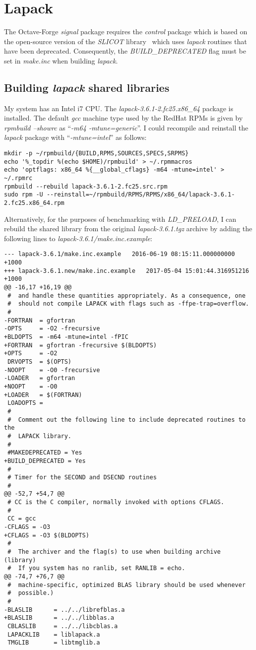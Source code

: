 \documentclass[a4paper,twoside,10pt,english]{report}
\begin{document}
\section*{Lapack}
The Octave-Forge \emph{signal} package requires the \emph{control} package
which is based on the open-source version of the \emph{SLICOT}
library~\cite{Slicot_ControlSystemsLibrary} which uses \emph{lapack} routines
that have been deprecated. Consequently, the \emph{BUILD\_DEPRECATED} flag
must be set in \emph{make.inc} when building \emph{lapack}.
\subsection*{Building \emph{lapack} shared libraries}
My system has an Intel i7 CPU. The \emph{lapack-3.6.1-2.fc25.x86\_64} package
is installed. The default \emph{gcc} machine type used by the RedHat RPMs is
given by \emph{rpmbuild --showrc} as ``\emph{-m64 -mtune=generic}''. I could
recompile and reinstall the \emph{lapack} package with ``\emph{-mtune=intel}''
as follows:
\begin{small}
\begin{verbatim}
mkdir -p ~/rpmbuild/{BUILD,RPMS,SOURCES,SPECS,SRPMS}
echo '%_topdir %(echo $HOME)/rpmbuild' > ~/.rpmmacros
echo 'optflags: x86_64 %{__global_cflags} -m64 -mtune=intel' > ~/.rpmrc
rpmbuild --rebuild lapack-3.6.1-2.fc25.src.rpm
sudo rpm -U --reinstall=~/rpmbuild/RPMS/RPMS/x86_64/lapack-3.6.1-2.fc25.x86_64.rpm 
\end{verbatim}
\end{small}
Alternatively, for the purposes of benchmarking with \emph{LD\_PRELOAD}, I
can rebuild the shared library from the original \emph{lapack-3.6.1.tgz}
archive by adding the following lines to \emph{lapack-3.6.1/make.inc.example}:
\begin{small}
\begin{verbatim}
--- lapack-3.6.1/make.inc.example	2016-06-19 08:15:11.000000000 +1000
+++ lapack-3.6.1.new/make.inc.example	2017-05-04 15:01:44.316951216 +1000
@@ -16,17 +16,19 @@
 #  and handle these quantities appropriately. As a consequence, one 
 #  should not compile LAPACK with flags such as -ffpe-trap=overflow.
 #
-FORTRAN  = gfortran 
-OPTS     = -O2 -frecursive
+BLDOPTS  = -m64 -mtune=intel -fPIC
+FORTRAN  = gfortran -frecursive $(BLDOPTS)
+OPTS     = -O2 
 DRVOPTS  = $(OPTS)
-NOOPT    = -O0 -frecursive
-LOADER   = gfortran
+NOOPT    = -O0
+LOADER   = $(FORTRAN)
 LOADOPTS =
 #
 #  Comment out the following line to include deprecated routines to the
 #  LAPACK library.
 #
 #MAKEDEPRECATED = Yes
+BUILD_DEPRECATED = Yes
 #
 # Timer for the SECOND and DSECND routines
 #
@@ -52,7 +54,7 @@
 # CC is the C compiler, normally invoked with options CFLAGS.
 #
 CC = gcc
-CFLAGS = -O3
+CFLAGS = -O3 $(BLDOPTS)
 #
 #  The archiver and the flag(s) to use when building archive (library)
 #  If you system has no ranlib, set RANLIB = echo.
@@ -74,7 +76,7 @@
 #  machine-specific, optimized BLAS library should be used whenever
 #  possible.)
 #
-BLASLIB      = ../../librefblas.a
+BLASLIB      = ../../libblas.a
 CBLASLIB     = ../../libcblas.a
 LAPACKLIB    = liblapack.a
 TMGLIB       = libtmglib.a
\end{verbatim}
\end{small}
\end{document}
